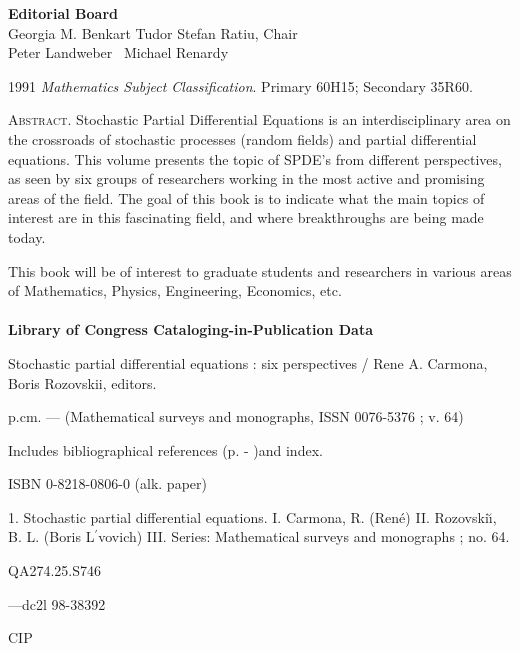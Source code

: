 \begin{copyrightpage}
\begin{center}
\textbf{Editorial Board}\\
Georgia M. Benkart \qquad  Tudor Stefan Ratiu, Chair\\
Peter Landweber \qquad\quad\ Michael Renardy
\end{center}

\begin{center}
1991 \emph{Mathematics Subject Classification}. Primary 60H15;
Secondary 35R60.
\end{center}

\noindent \textsc{Abstract.} Stochastic Partial Differential
Equations is an interdisciplinary area on the crossroads of
stochastic processes (random fields) and partial differential
equations. This volume presents the topic of SPDE's from different
perspectives, as seen by six groups of researchers working in the
most active and promising areas of the field. The goal of this book
is to indicate what the main topics of interest are in this
fascinating field, and where breakthroughs are being made today.

This book will be of interest to graduate students and researchers in various areas of Mathematics, Physics, Engineering, Economics, etc.\\

\hrulefill\\

\noindent \textbf{Library of Congress Cataloging-in-Publication
Data}

\noindent Stochastic partial differential equations : six
perspectives / Rene A. Carmona, Boris Rozovskii, editors.

\quad p.cm. --- (Mathematical surveys and monographs, ISSN 0076-5376
; v. 64)

Includes bibliographical references (p. - )and index.

ISBN 0-8218-0806-0 (alk. paper)

1. Stochastic partial differential equations. I. Carmona, R.
(Ren\'{e}) II. Rozovski\u{\i}, B. L. (Boris L$^{\prime}$vovich) III.
Series: Mathematical surveys and monographs ; no. 64.

\noindent QA274.25.S746 

---dc2l \hfill 98-38392

\hfill CIP\\

\hrulefill\\


\end{copyrightpage}
